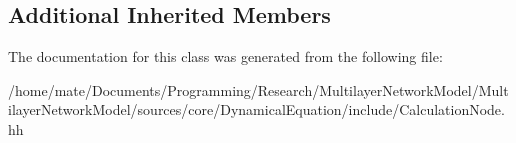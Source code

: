 \subsection*{Additional Inherited Members}


The documentation for this class was generated from the following file\+:\begin{DoxyCompactItemize}
\item 
/home/mate/\+Documents/\+Programming/\+Research/\+Multilayer\+Network\+Model/\+Multilayer\+Network\+Model/sources/core/\+Dynamical\+Equation/include/Calculation\+Node.\+hh\end{DoxyCompactItemize}
